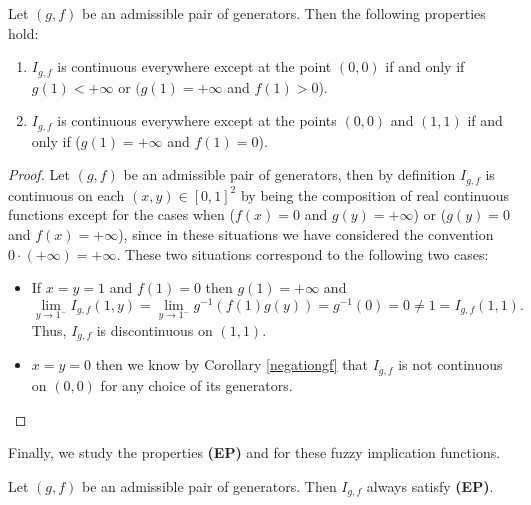 \begin{proposition}\label{prop:(g,f)continuity}
Let $(g,f)$ be an admissible pair of generators. Then the following properties hold:
	\begin{enumerate}[label=(\roman*)]
		\item $I_{g,f}$ is continuous everywhere except at the point $(0,0)$ if and only if $g(1)<+\infty$ or $(g(1)=+\infty$ and $f(1)>0$).
		\item $I_{g,f}$ is continuous everywhere except at the points $(0,0)$ and $(1,1)$ if and only if ($g(1)=+\infty$ and $f(1)=0$).
	\end{enumerate}
\end{proposition}
\begin{proof}
	Let $(g,f)$ be an admissible pair of generators, then by definition $I_{g,f}$ is continuous on each $(x,y) \in [0,1]^2$ by being the composition of real continuous functions except for the cases when ($f(x)=0$ and $g(y)=+\infty$) or ($g(y)=0$ and $f(x)=+\infty$), since in these situations we have considered the convention $0 \cdot (+\infty)=+\infty$. These two situations correspond to the following two cases:
	\begin{itemize}
		\item If $x=y=1$ and $f(1)=0$ then $g(1)=+\infty$ and 
		$$\lim_{y \to 1^-} I_{g,f}(1,y)=\lim_{y \to 1^-} g^{-1}(f(1)g(y)) = g^{-1}(0)=0 \not = 1 =I_{g,f}(1,1).$$
		Thus, $I_{g,f}$ is discontinuous on $(1,1)$.	
		\item $x=y=0$ then we know by Corollary \ref{negationgf} that $I_{g,f}$ is not continuous on $(0,0)$ for any choice of its generators.
	\end{itemize}
\end{proof}
Finally, we study the properties {\bf (EP)} and \LI for these fuzzy implication functions.
\begin{proposition}\label{(EP)gf} 
	Let $(g,f)$ be an admissible pair of generators. Then $I_{g,f}$ always satisfy {\bf (EP)}.
\end{proposition}

